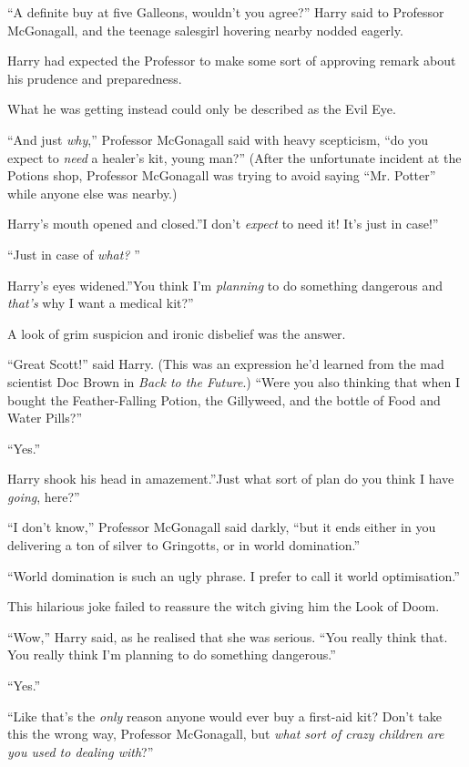 ``A definite buy at five Galleons, wouldn't you agree?'' Harry said to
Professor McGonagall, and the teenage salesgirl hovering nearby nodded
eagerly.

Harry had expected the Professor to make some sort of approving remark
about his prudence and preparedness.

What he was getting instead could only be described as the Evil Eye.

``And just \emph{why},'' Professor McGonagall said with heavy scepticism,
``do you expect to \emph{need} a healer's kit, young man?'' (After the
unfortunate incident at the Potions shop, Professor McGonagall was
trying to avoid saying ``Mr. Potter'' while anyone else was nearby.)

Harry's mouth opened and closed.''I don't \emph{expect} to need it! It's
just in case!''

``Just in case of \emph{what?} ''

Harry's eyes widened.''You think I'm \emph{planning} to do something
dangerous and \emph{that's} why I want a medical kit?''

A look of grim suspicion and ironic disbelief was the answer.

``Great Scott!'' said Harry. (This was an expression he'd learned from
the mad scientist Doc Brown in \emph{Back to the Future}.) ``Were you
also thinking that when I bought the Feather-Falling Potion, the
Gillyweed, and the bottle of Food and Water Pills?''

``Yes.''

Harry shook his head in amazement.''Just what sort of plan do you think
I have \emph{going}, here?''

``I don't know,'' Professor McGonagall said darkly, ``but it ends either
in you delivering a ton of silver to Gringotts, or in world
domination.''

``World domination is such an ugly phrase. I prefer to call it world
optimisation.''

This hilarious joke failed to reassure the witch giving him the Look of
Doom.

``Wow,'' Harry said, as he realised that she was serious. ``You really
think that. You really think I'm planning to do something dangerous.''

``Yes.''

``Like that's the \emph{only} reason anyone would ever buy a first-aid
kit? Don't take this the wrong way, Professor McGonagall, but \emph{what
sort of crazy children are you used to dealing with}?''

